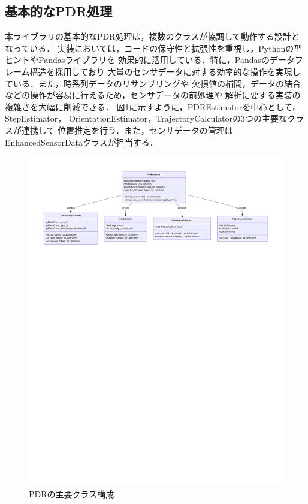 
\subsection{基本的なPDR処理}

本ライブラリの基本的なPDR処理は，複数のクラスが協調して動作する設計となっている．
実装においては，コードの保守性と拡張性を重視し，Pythonの型ヒントやPandasライブラリを
効果的に活用している．特に，Pandasのデータフレーム構造を採用しており
大量のセンサデータに対する効率的な操作を実現している．また，時系列データのリサンプリングや
欠損値の補間，データの結合などの操作が容易に行えるため，センサデータの前処理や
解析に要する実装の複雑さを大幅に削減できる．
図\ref{fig:pdr-class}に示すように，PDREstimatorを中心として，StepEstimator，
OrientationEstimator，TrajectoryCalculatorの3つの主要なクラスが連携して
位置推定を行う．また，センサデータの管理はEnhancedSensorDataクラスが担当する．

\begin{figure}[ht]
    \centering
    \includegraphics[width=\linewidth]{image/pdr-class-diagram.pdf}
    \caption{PDRの主要クラス構成}
    \label{fig:pdr-class}
\end{figure}

